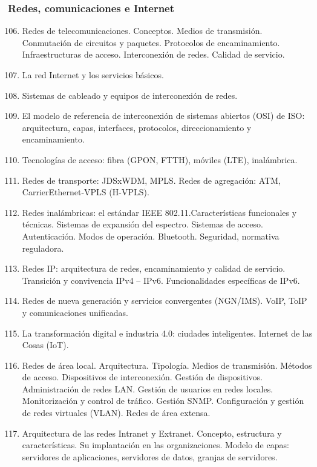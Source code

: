 	\subsubsection{Redes, comunicaciones e Internet}
	\begin{enumerate}
		\setcounter{enumi}{105}
		\item Redes de telecomunicaciones. Conceptos. Medios de transmisión. Conmutación de circuitos y paquetes. Protocolos de encaminamiento. Infraestructuras de acceso. Interconexión de redes. Calidad de servicio.
		\item La red Internet y los servicios básicos.
		\item Sistemas de cableado y equipos de interconexión de redes.
		\item El modelo de referencia de interconexión de sistemas abiertos (OSI) de ISO: arquitectura, capas, interfaces, protocolos, direccionamiento y encaminamiento.
		\item Tecnologías de acceso: fibra (GPON, FTTH), móviles (LTE), inalámbrica. 
		\item Redes de transporte: JDSxWDM, MPLS. Redes de agregación: ATM, CarrierEthernet-VPLS (H-VPLS).
		\item Redes inalámbricas: el estándar IEEE 802.11.Características funcionales y técnicas. Sistemas de expansión del espectro. Sistemas de acceso. Autenticación. Modos de operación. Bluetooth. Seguridad, normativa reguladora.
		\item Redes IP: arquitectura de redes, encaminamiento y calidad de servicio. Transición y convivencia IPv4 – IPv6. Funcionalidades específicas de IPv6.
		\item Redes de nueva generación y servicios convergentes (NGN/IMS). VoIP, ToIP y comunicaciones unificadas.
		\item La transformación digital e industria 4.0: ciudades inteligentes. Internet de las Cosas (IoT).
		\item Redes de área local. Arquitectura. Tipología. Medios de transmisión. Métodos de acceso. Dispositivos de interconexión. Gestión de dispositivos. Administración de redes LAN. Gestión de usuarios en redes locales. Monitorización y control de tráfico. Gestión SNMP. Configuración y gestión de redes virtuales (VLAN). Redes de área extensa. 
		\item Arquitectura de las redes Intranet y Extranet. Concepto, estructura y características. Su implantación en las organizaciones. Modelo de capas: servidores de aplicaciones, servidores de datos, granjas de servidores. 

\end{enumerate}
